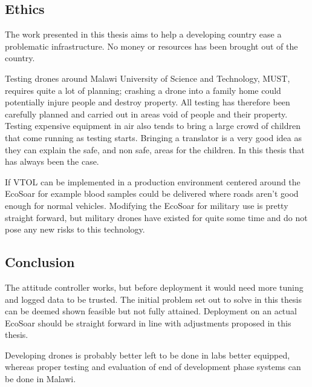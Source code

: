 \documentclass{article}
\begin{document}
\subsection{Ethics}
The work presented in this thesis aims to help a developing country ease a problematic infrastructure.
No money or resources has been brought out of the country.

Testing drones around Malawi University of Science and Technology, MUST, requires quite a lot of planning; crashing a drone into a family home could potentially injure people and destroy property.
All testing has therefore been carefully planned and carried out in areas void of people and their property.
Testing expensive equipment in air also tends to bring a large crowd of children that come running as testing starts.
Bringing a translator is a very good idea as they can explain the safe, and non safe, areas for the children.
In this thesis that has always been the case.

If VTOL can be implemented in a production environment centered around the EcoSoar for example blood samples could be delivered where roads aren't good enough for normal vehicles.
Modifying the EcoSoar for military use is pretty straight forward, but military drones have existed for quite some time and do not pose any new risks to this technology.


\subsection{Conclusion}
The attitude controller works, but before deployment it would need more tuning and logged data to be trusted.
The initial problem set out to solve in this thesis can be deemed shown feasible but not fully attained.
Deployment on an actual EcoSoar should be straight forward in line with adjustments proposed in this thesis.

Developing drones is probably better left to be done in labs better equipped, whereas proper testing and evaluation of end of development phase systems can be done in Malawi.


\newpage
\end{document}
